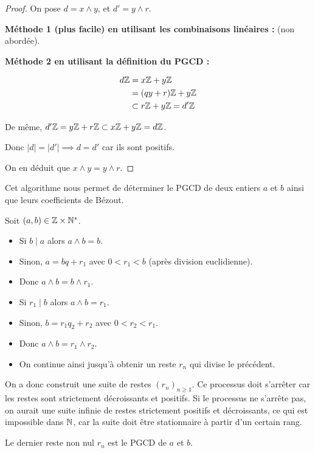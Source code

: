 \documentclass[12pt, a4paper]{report}
\begin{document}
\begin{proof}
    On pose $d=x\wedge y$, et $d' = y \wedge r$.

    \textbf{Méthode 1 (plus facile) en utilisant les combinaisons linéaires :} (non abordée).

    \textbf{Méthode 2 en utilisant la définition du PGCD :}

    \begin{align*}
        d\mathbb{Z} &= x\mathbb{Z} + y\mathbb{Z}\\
        &= (qy+r)\mathbb{Z} + y\mathbb{Z}\\
        &\subset r\mathbb{Z} + y\mathbb{Z}=d'\mathbb{Z}\\
    \end{align*}

    De même, $d'\mathbb{Z} = y\mathbb{Z} + r\mathbb{Z} \subset x\mathbb{Z} + y\mathbb{Z} = d\mathbb{Z}$.

    Donc $|d| = |d'| \implies d = d'$ car ils sont positifs.

    On en déduit que $x \wedge y = y \wedge r$.

\end{proof}

\begin{application}
    Cet algorithme nous permet de déterminer le PGCD de deux entiers $a$ et $b$ ainsi que leurs coefficients de Bézout.

    Soit $(a,b) \in \mathbb{Z}\times\mathbb{N}^*$.

    \begin{itemize}
        \item Si $b\mid a$ alors $a\wedge b = b$.
        \item Sinon, $a=bq+r_1$ avec $0<r_1< b$ (après division euclidienne).
        \item Donc $a\wedge b = b \wedge r_1$.
        \item Si $r_1 \mid b$ alors $a\wedge b = r_1$.
        \item Sinon, $b = r_1 q_2 + r_2$ avec $0 < r_2 < r_1$.
        \item Donc $a\wedge b = r_1 \wedge r_2$.
        \item On continue ainsi jusqu'à obtenir un reste $r_n$ qui divise le précédent.
    \end{itemize}

    On a donc construit une suite de restes $(r_n)_{n\ge1}$. Ce processus doit s'arrêter car les restes sont strictement décroissants et positifs. Si le processus ne s'arrête pas, on aurait une suite infinie de restes strictement positifs et décroissants, ce qui est impossible dans $\mathbb{N}$, car la suite doit être stationnaire à partir d'un certain rang.

    Le dernier reste non nul $r_n$ est le PGCD de $a$ et $b$.
\end{application}
\end{document}
